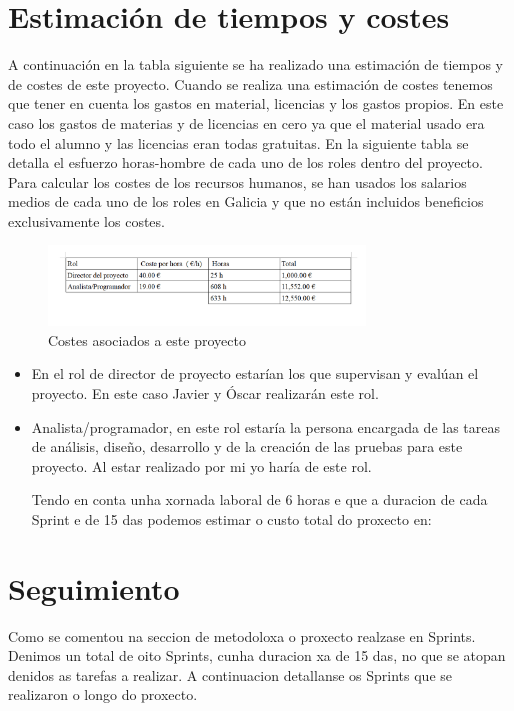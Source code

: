 \section{Estimación de tiempos y costes}
 A continuación en la tabla siguiente se ha realizado una estimación de tiempos y de costes de este proyecto.
 Cuando se realiza una estimación de costes tenemos que tener en cuenta los gastos en material, licencias y los gastos propios. En este caso los gastos de materias y de licencias en cero ya que el material usado era todo el alumno y las licencias eran todas gratuitas.
 En la siguiente tabla se detalla el esfuerzo horas-hombre de cada uno de los roles dentro del proyecto. Para calcular los costes de los recursos humanos, se han usados los salarios medios de cada uno de los roles en Galicia y que no están incluidos beneficios exclusivamente los costes. 
 
 
 
\begin{figure}[H]
		\centering
		\includegraphics[width=0.75\textwidth] {coste.png}
		\caption{Costes asociados a este proyecto }
	\end{figure}






\begin{itemize}
\item En el rol de director de proyecto estarían los que 
supervisan y evalúan el proyecto. En este caso Javier y Óscar realizarán este rol.

\item Analista/programador, en este rol estaría la persona encargada de las tareas de análisis, diseño, desarrollo y de la creación de las pruebas para este proyecto. Al estar realizado por mi yo haría de este rol.




 Tendo en conta unha
xornada laboral de 6 horas e que a duracion de cada Sprint e de 15 das podemos estimar
o custo total do proxecto en:
\end{itemize}
\section{Seguimiento}
Como se comentou na seccion de metodoloxa o proxecto realzase en Sprints. Denimos
un total de oito Sprints, cunha duracion xa de 15 das, no que se atopan denidos
as tarefas a realizar. A continuacion detallanse os Sprints que se realizaron o longo do
proxecto.